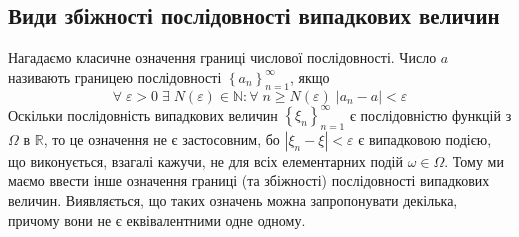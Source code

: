 \subsection{Види збіжності послідовності випадкових величин}
Нагадаємо класичне означення границі числової послідовності. Число $a$ називають границею послідовності 
$\left\{ a_n\right\}_{n=1}^{\infty}$, якщо
$$ \forall \; \varepsilon > 0 \; \exists \; N(\varepsilon) \in \mathbb{N}: \forall \; n \geq N(\varepsilon) \; \left| a_n - a\right| < \varepsilon$$
Оскільки послідовність випадкових величин $\left\{ \xi_n\right\}_{n=1}^{\infty}$ є послідовністю функцій з $\Omega$ в $\mathbb{R}$, то це означення
не є застосовним, бо $\left| \xi_n - \xi\right| < \varepsilon$ є випадковою подією, що виконується, взагалі кажучи, не для всіх елементарних подій
$\omega \in \Omega$. Тому ми маємо ввести інше означення границі (та збіжності) послідовності
випадкових величин. Виявляється, що таких означень можна запропонувати декілька, причому вони
не є еквівалентними одне одному.
\vspace{1em}
